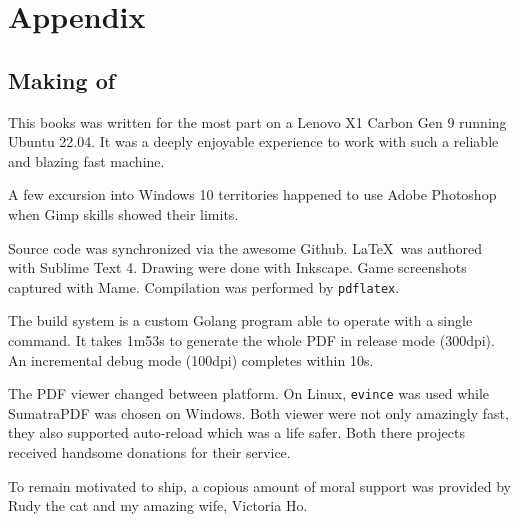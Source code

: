 \chapter{Appendix} 

\section{Making of}

This books was written for the most part on a Lenovo X1 Carbon Gen 9 running Ubuntu 22.04. It was a deeply enjoyable experience to work with such a reliable and blazing fast machine. 


A few excursion into Windows 10 territories happened to use Adobe Photoshop when Gimp skills showed their limits. 

Source code was synchronized via the awesome Github. \LaTeX\ was authored with Sublime Text 4. Drawing were done with Inkscape. Game screenshots captured with Mame. Compilation was performed by \texttt{pdflatex}.

The build system is a custom Golang program able to operate with a single  command. It takes 1m53s to generate the whole PDF in release mode (300dpi). An incremental debug mode (100dpi) completes within 10s. 

The PDF viewer changed between platform. On Linux, \texttt{evince} was used while SumatraPDF was chosen on Windows. Both viewer were not only amazingly fast, they also supported auto-reload which was a life safer. Both there projects received handsome donations for their service.

To remain motivated to ship, a copious amount of moral support was provided by Rudy the cat and my amazing wife, Victoria Ho.
